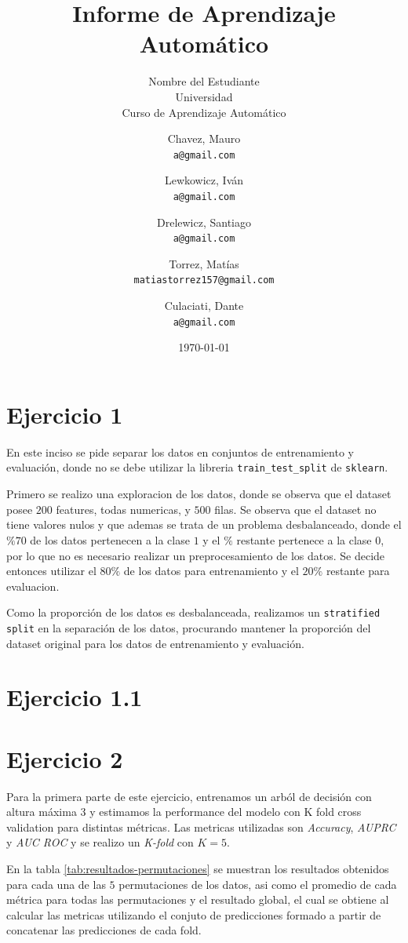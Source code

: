 \documentclass[10pt,a4paper]{article}
\title{Informe de Aprendizaje Automático}
\author{Nombre del Estudiante \\ Universidad \\ Curso de Aprendizaje Automático}
\author{
    Chavez, Mauro \\
    \texttt{a@gmail.com}
    \and
    Lewkowicz, Iván \\
    \texttt{a@gmail.com}
    \and
    Drelewicz, Santiago \\
    \texttt{a@gmail.com}
    \and
    Torrez, Matías \\
    \texttt{matiastorrez157@gmail.com}
    \and
    Culaciati, Dante \\
    \texttt{a@gmail.com}
}
\date{\today}
\begin{document}
\maketitle

\newpage

\section{Ejercicio 1}
\par En este inciso se pide separar los datos en conjuntos de entrenamiento y evaluación, donde no se debe utilizar la libreria \texttt{train\_test\_split} de \texttt{sklearn}.

\par Primero se realizo una exploracion de los datos, donde se observa que el dataset posee $200$ features, todas numericas, y $500$ filas.
Se observa que el dataset no tiene valores nulos y que ademas se trata de un problema desbalanceado, donde el $\%70$ de los datos pertenecen a la clase $1$ y el $\%$ restante pertenece a la clase $0$, por lo que no es necesario realizar un preprocesamiento de los datos. 
Se decide entonces utilizar el $80\%$ de los datos para entrenamiento y el $20\%$ restante para evaluacion.

\par Como la proporción de los datos es desbalanceada, realizamos un \texttt{stratified split} en la separación de los datos, procurando mantener la proporción del dataset original para los datos de entrenamiento y evaluación. 

\section{Ejercicio 1.1}
\section{Ejercicio 2}
\par Para la primera parte de este ejercicio, entrenamos un arból de decisión con altura máxima 3 y estimamos la performance del modelo con K fold cross validation para distintas métricas. 
Las metricas utilizadas son \textit{Accuracy}, \textit{AUPRC} y \textit{AUC ROC} y se realizo un \textit{K-fold} con $K=5$.
\par En la tabla \ref{tab:resultados-permutaciones} se muestran los resultados obtenidos para cada una de las $5$ permutaciones de los datos, asi como el promedio de cada métrica para todas las permutaciones y el resultado global,
el cual se obtiene al calcular las metricas utilizando el conjuto de predicciones formado a partir de concatenar las predicciones de cada fold.
\end{document}
